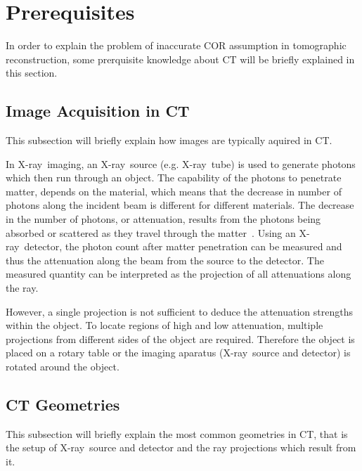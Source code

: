 \documentclass[10pt,journal,compsoc]{IEEEtran}
\newcommand{\xray}{X-ray~}
\begin{document}


\section{Prerequisites}
In order to explain the problem of inaccurate COR assumption in tomographic reconstruction, some prerquisite knowledge about CT will be briefly explained in this section.

\subsection{Image Acquisition in CT}\label{ssec:imageacquisition}
This subsection will briefly explain how images are typically aquired in CT.

In \xray imaging, an \xray source (e.g. \xray tube) is used to generate photons which then run through an object.
The capability of the photons to penetrate matter, depends on the material, which means that the decrease in number of photons along the incident beam is different for different materials.
The decrease in the number of photons, or attenuation, results from the photons being absorbed or scattered as they travel through the matter~\cite{Buzug2008_chap1}.
Using an \xray detector, the photon count after matter penetration can be measured and thus the attenuation along the beam from the source to the detector.
The measured quantity can be interpreted as the projection of all attenuations along the ray.

However, a single projection is not sufficient to deduce the attenuation strengths within the object. 
To locate regions of high and low attenuation, multiple projections from different sides of the object are required.
Therefore the object is placed on a rotary table or the imaging aparatus (\xray source and detector) is rotated around the object.


\subsection{CT Geometries}
This subsection will briefly explain the most common geometries in CT, that is the setup of \xray source and detector and the ray projections which result from it.
\end{document}
